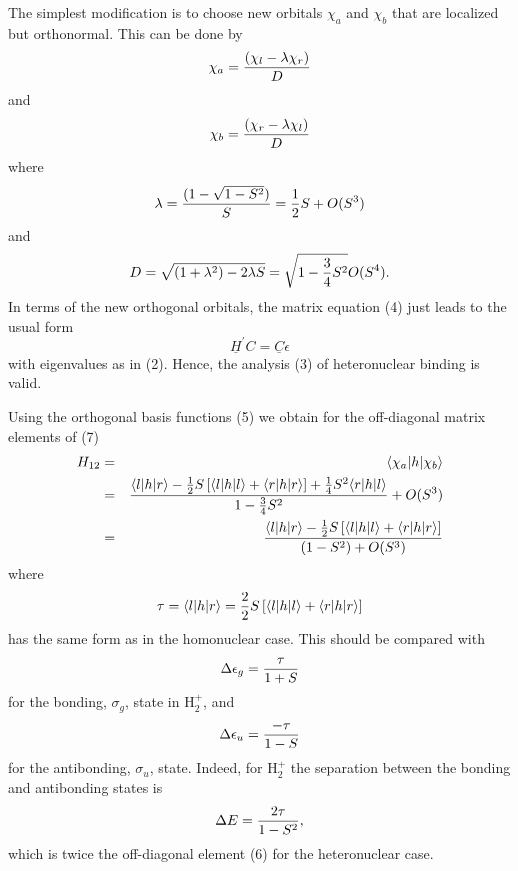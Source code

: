 The simplest modification is to choose new orbitals $\chi_a$ and 
$\chi_b$ that are localized but orthonormal. This can be done by
\begin{equation}
\chi_a = {( \chi_l - \lambda \chi_r ) \over D}
\label{chap17-eqno5a}
\end{equation}
and
\begin{equation}
\chi_b = {( \chi_r - \lambda \chi_l ) \over D}
\label{chap17-eqno5b}
\end{equation}
where
\begin{equation}
\lambda = {(1 - \sqrt{1-S^2}) \over S} = {1 \over 2} S + O(S^3)
\label{chap17-eqno6a}
\end{equation}
and
\begin{equation}
D = \sqrt{(1 + \lambda^2) - 2 \lambda S} = \sqrt{1 - {3 \over 4} S^2} 
O(S^4) .
\label{chap17-eqno6b}
\end{equation}
In terms of the new orthogonal orbitals, the matrix equation (4) just leads
to the usual form
\begin{equation}
\underline{H}^{\prime} C = \underline{C} \epsilon
\label{chap17-eqno7}
\end{equation}
with eigenvalues as in (2).  Hence, the analysis (3) of heteronuclear binding
is valid.

Using the orthogonal basis functions (5) we obtain for the off-diagonal
matrix elements of (7)
\begin{eqnarray}
H_{12} &=& \langle \chi_a | h | \chi_b \rangle\cr
&=& {\langle l | h | r \rangle - {1 \over 2} S \left[ \langle l | h | 
l \rangle + \langle r | h | r \rangle \right] + {1 \over 4} S^2 
\langle r | h | l \rangle \over 1 - {3 \over 4} S^2} + O(S^3)\cr
&=& {\langle l | h | r \rangle - {1 \over 2} S \left[ \langle l | h | 
l \rangle + \langle r | h | r \rangle \right] \over 
(1-S^2)+O(S^3)}
\end{eqnarray}
where
\begin{equation}
\tau = \langle l | h | r \rangle = {2 \over 2} S \left[ \langle l | h 
| l \rangle  + \langle r | h | r \rangle \right]
\end{equation}
has the same form as in the homonuclear case. This should be compared
with
\begin{equation}
\Delta \epsilon_g = {\tau \over 1 +S}
\end{equation}
for the bonding, $\sigma_g$, state in H$^+_2$, and
\begin{equation}
\Delta \epsilon_u = {- \tau \over 1 - S}
\end{equation}
for the antibonding, $\sigma_u$, state.  Indeed, for H$^+_2$ the 
separation between the bonding and antibonding states is
\begin{equation}
\Delta E = {2 \tau \over 1 - S^2} ,
\end{equation}
which is twice the off-diagonal element (6) for the heteronuclear case.

